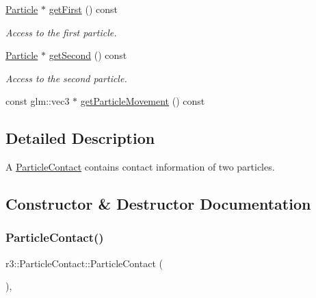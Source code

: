 \begin{DoxyCompactItemize}
\mbox{\hyperlink{classr3_1_1_particle}{Particle}} $\ast$ \mbox{\hyperlink{classr3_1_1_particle_contact_a4f82d0a6a21ea6582be9cec146fc7234}{get\+First}} () const
\begin{DoxyCompactList}\small\item\em Access to the first particle. \end{DoxyCompactList}\item 
\mbox{\hyperlink{classr3_1_1_particle}{Particle}} $\ast$ \mbox{\hyperlink{classr3_1_1_particle_contact_ad2002c182f5a4716a35dd0110af7c476}{get\+Second}} () const
\begin{DoxyCompactList}\small\item\em Access to the second particle. \end{DoxyCompactList}\item 
const glm\+::vec3 $\ast$ \mbox{\hyperlink{classr3_1_1_particle_contact_af56ceb020653556811766410119351fa}{get\+Particle\+Movement}} () const
\end{DoxyCompactItemize}


\subsection{Detailed Description}
A \mbox{\hyperlink{classr3_1_1_particle_contact}{Particle\+Contact}} contains contact information of two particles. 

\subsection{Constructor \& Destructor Documentation}
\mbox{\label{classr3_1_1_particle_contact_a57d3527a606d63a48816aae93d403eee}} 
\subsubsection{\texorpdfstring{Particle\+Contact()}{ParticleContact()}}
{\footnotesize\ttfamily r3\+::\+Particle\+Contact\+::\+Particle\+Contact (\begin{DoxyParamCaption}{ }\end{DoxyParamCaption})\hspace{0.3cm}{\ttfamily [explicit]}, {\ttfamily [default]}}

\mbox{\label{classr3_1_1_particle_contact_ab6524a4421fd38a282fecaf013d053a2}} 

